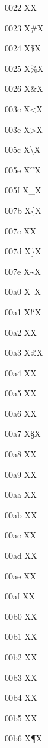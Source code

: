 \documentclass[11pt]{article}
\begin{document}
\renewcommand{\|}{} %
\newcommand{\B}{} %
\newcommand{\G}{} %
\newcommand{\U}{} %
\newcommand{\h}{} %
\newcommand{\OHORN}{} %
\newcommand{\ohorn}{} %
\newcommand{\UHORN}{} %
\newcommand{\uhorn}{} %
\newcommand{\textsubbreve}{} %
\newcommand{\cb}{} %
0022 X{\textquotedbl}X

0023 X{\#}X

0024 X{\$}X

0025 X{\%}X

0026 X{\&}X

003c X{\textless}X

003e X{\textgreater}X

005c X{\textbackslash}X

005e X{\^{}}X

005f X{\_}X

007b X{\{}X

007c X{\textbar}X

007d X{\}}X

007e X{\~{}}X

00a0 X{~}X

00a1 X{!`}X

00a2 X{\textcent}X

00a3 X{\pounds}X

00a4 X{\textcurrency}X

00a5 X{\textyen}X

00a6 X{\textbrokenbar}X

00a7 X{\S}X

00a8 X{\textasciidieresis}X

00a9 X{\textcopyright}X

00aa X{\textordfeminine}X

00ab X{\guillemotleft}X

00ac X{\textlnot}X

00ad X{\-}X

00ae X{\textregistered}X

00af X{\textasciimacron}X

00b0 X{\textdegree}X

00b1 X{\textpm}X

00b2 X{\texttwosuperior}X

00b3 X{\textthreesuperior}X

00b4 X{\textasciiacute}X

00b5 X{\textmu}X

00b6 X{\P}X
\end{document}
